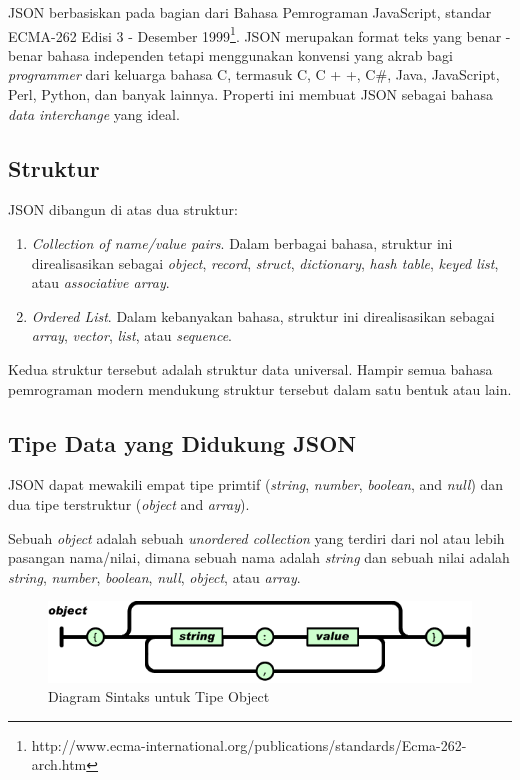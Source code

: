 \documentclass[a4paper, 12pt]{report}
\begin{document}
\onehalfspacing JSON berbasiskan pada bagian dari Bahasa Pemrograman JavaScript, standar ECMA-262 Edisi 3 - Desember 1999\footnote{http://www.ecma-international.org/publications/standards/Ecma-262-arch.htm}. JSON merupakan format teks yang benar - benar bahasa independen tetapi menggunakan konvensi yang akrab bagi \textit{programmer} dari keluarga bahasa C, termasuk C, C + +, C\#, Java, JavaScript, Perl, Python, dan banyak lainnya. Properti ini membuat JSON sebagai bahasa \textit{data interchange} yang ideal\cite{introducing-json}.

\subsection{Struktur}
\onehalfspacing JSON dibangun di atas dua struktur\cite{introducing-json}:
\begin{enumerate}
  \item \textit{Collection of name/value pairs}. Dalam berbagai bahasa, struktur ini direalisasikan sebagai \textit{object}, \textit{record}, \textit{struct}, \textit{dictionary}, \textit{hash table}, \textit{keyed list}, atau \textit{associative array}.
  \item \textit{Ordered List}. Dalam kebanyakan bahasa, struktur ini direalisasikan sebagai \textit{array}, \textit{vector}, \textit{list}, atau \textit{sequence}.
\end{enumerate}

\onehalfspacing Kedua struktur tersebut adalah struktur data universal. Hampir semua bahasa pemrograman modern mendukung struktur tersebut dalam satu bentuk atau lain.

\subsection{Tipe Data yang Didukung JSON}
\onehalfspacing JSON dapat mewakili empat tipe primtif (\textit{string}, \textit{number}, \textit{boolean}, and \textit{null}) dan dua tipe terstruktur (\textit{object} and \textit{array})\cite{rfc-4627}.

\onehalfspacing Sebuah \textit{object} adalah sebuah \textit{unordered collection} yang terdiri dari nol atau lebih pasangan nama/nilai, dimana sebuah nama adalah \textit{string} dan sebuah nilai adalah \textit{string}, \textit{number}, \textit{boolean}, \textit{null}, \textit{object}, atau \textit{array}.

\begin{figure}[htp]
\centering
\includegraphics[scale=0.55]{images/object-json.png}
\caption{Diagram Sintaks untuk Tipe Object\cite{json-fat-free}}
\label{Diagram Sintaks untuk Tipe Object}
\end{figure}
\end{document}
